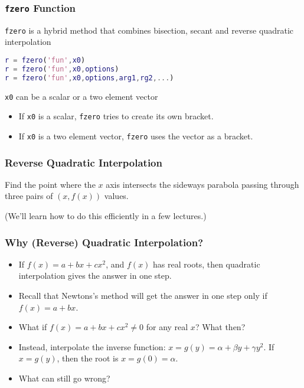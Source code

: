 \documentclass[10pt]{beamer}
\begin{document}
\begin{frame}[fragile]
\frametitle{\texttt{fzero} Function}

\texttt{fzero} is a hybrid method that combines bisection,
secant and reverse quadratic interpolation

\vspace{3ex}
\begin{lstlisting}[language=matlab]
r = fzero('fun',x0)
r = fzero('fun',x0,options)
r = fzero('fun',x0,options,arg1,rg2,...)
\end{lstlisting}

\vspace{3ex}
\texttt{x0} can be a scalar or a two element vector
\begin{itemize}
    \item   If \texttt{x0} is a scalar, \texttt{fzero} tries to
            create its own bracket.
    \item   If \texttt{x0} is a two element vector, \texttt{fzero}
            uses the vector as a bracket.
\end{itemize}



\end{frame}
\begin{frame}
\frametitle{Reverse Quadratic Interpolation}

\vspace{2ex}
Find the point where the $x$ axis intersects the sideways parabola passing
through three pairs of $(x,f(x))$ values.

\begin{center}
\end{center}

(We'll learn how to do this efficiently in a few lectures.)

\end{frame}
\begin{frame}
\frametitle{Why (Reverse) Quadratic Interpolation?}
\begin{itemize}
\item If $f(x) = a + bx + cx^2$, and $f(x)$ has real roots, then quadratic 
interpolation gives the answer in one step.
\item Recall that Newtons's method will get the answer in one step
  only if $f(x) = a + bx$.  
\item What if $f(x) = a + bx + cx^2 \ne 0$ for any real $x$?  What
  then?
\item Instead, interpolate the inverse function: $x = g(y) = \alpha +
  \beta y + \gamma y^2$.  If $x = g(y)$, then the root is $x = g(0) =
  \alpha$.
\item What can still go wrong?
\end{itemize}

\end{frame}
\end{document}
